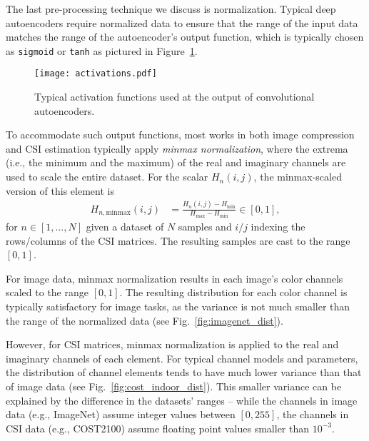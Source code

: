 The last pre-processing technique we discuss is normalization. Typical deep autoencoders require normalized data to ensure that the range of the input data matches the range of the autoencoder's output function, which is typically chosen as \texttt{sigmoid} or \texttt{tanh} as pictured in Figure~\ref{fig:ae_output_fx}. 
\begin{figure}[htb]
  \centering
  \texttt{[image: activations.pdf]}
  \caption{Typical activation functions used at the output of convolutional autoencoders.}
  \label{fig:ae_output_fx}
\end{figure}
To accommodate such output functions, most works in both image compression and CSI estimation typically apply \emph{minmax normalization}, where the extrema (i.e., the minimum and the maximum) of the real and imaginary channels are used to scale the entire dataset. For the scalar $H_n(i,j)$, the minmax-scaled version of this element is
\begin{align*}
	H_{n,\text{minmax}}(i,j) &= \frac{H_n(i,j)-H_{\text{min}}}{H_{\text{max}}-H_{\text{min}}} \in [0,1],
\end{align*}
for $n \in [1,\dots,N]$ given a dataset of $N$ samples and $i/j$ indexing the rows/columns of the CSI matrices. The resulting samples are cast to the range $[0,1]$. %

For image data, minmax normalization results in each image's color channels scaled to the range $[0,1]$. The resulting distribution for each color channel is typically satisfactory for image tasks, as the variance is not much smaller than the range of the normalized data (see Fig.~\ref{fig:imagenet_dist}).

However, for CSI matrices, minmax normalization is applied to the real and imaginary channels of each element. For typical channel models and parameters, the distribution of channel elements tends to have much lower variance than that of image data (see Fig.~\ref{fig:cost_indoor_dist}). This smaller variance can be explained by the difference in the datasets' ranges -- while the channels in image data (e.g., ImageNet) assume integer values between $[0,255]$, the channels in CSI data (e.g., COST2100) assume floating point values smaller than $10^{-3}$.

